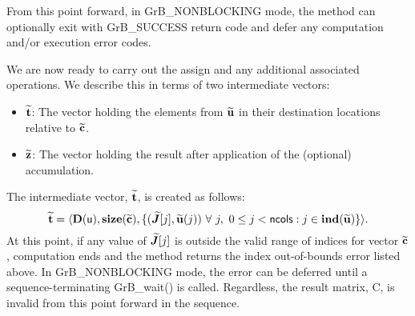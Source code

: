 From this point forward, in {\sf GrB\_NONBLOCKING} mode, the method can 
optionally exit with {\sf GrB\_SUCCESS} return code and defer any computation 
and/or execution error codes.

We are now ready to carry out the assign and any additional 
associated operations.  We describe this in terms of two intermediate vectors:
\begin{itemize}
    \item ${\bf \widetilde{t}}$: The vector holding the elements from
    ${\bf \widetilde{u}}$ in their destination locations relative to 
    ${\bf \widetilde{c}}$.
    
    \item ${\bf \widetilde{z}}$: The vector holding the result after 
    application of the (optional) accumulation.
\end{itemize}

The intermediate vector, ${\bf \widetilde{t}}$, is created as follows:
\[
\vector{\widetilde{t}} = \langle
\bold{D}({\sf u}), \bold{size}(\vector{\widetilde{c}}),
\{(\array{\widetilde{J}}[j],\vector{\widetilde{u}}(j)) \ \forall \ j, \ 
0 \leq j < {\sf ncols} : j \in \bold{ind}(\vector{\widetilde{u}}) \} \rangle. 
\]
At this point, if any value of $\bm{\widetilde{J}}[j]$ is outside the valid 
range of indices for vector ${\bf \widetilde{c}}$, computation ends and the 
method returns the index out-of-bounds error listed above. In 
{\sf GrB\_NONBLOCKING} mode, the error can be deferred until a 
sequence-terminating {\sf GrB\_wait()} is called.  Regardless, the result 
matrix, {\sf C}, is invalid from this point forward in the 
sequence.

